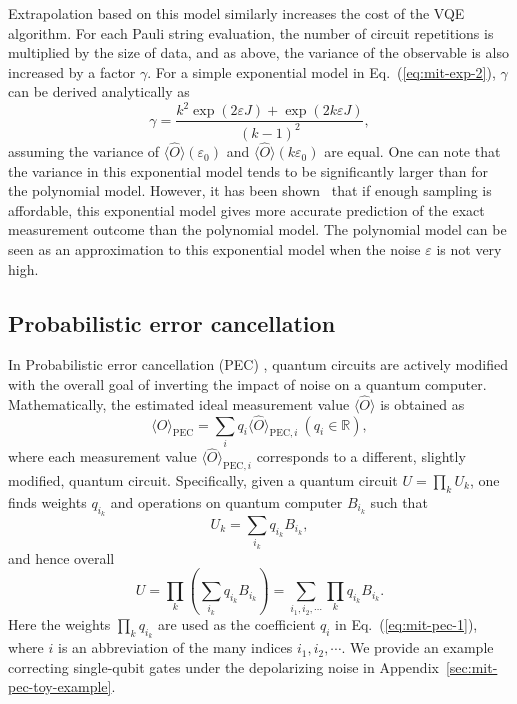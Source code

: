 Extrapolation based on this model similarly increases the cost of the VQE  algorithm.  For each Pauli string evaluation, the number of circuit repetitions is multiplied by the size of data, and as above, the variance of the observable is also increased by a factor $\gamma$.  For a simple exponential model in Eq.~(\ref{eq:mit-exp-2}), $\gamma$ can be derived analytically as \cite{suguru2019a}
\begin{equation}
    \gamma = \frac{k^{2} \exp(2\varepsilon J)+\exp(2 k \varepsilon J )}{(k-1)^{2}},
\end{equation}
assuming the variance of $\langle \hat{O} \rangle( \varepsilon _{0})$ and $\langle \hat{O} \rangle( k\varepsilon _{0})$ are equal.
One can note that the variance in this exponential model tends to be significantly larger than for the polynomial model. %
However, it has been shown~\cite{endoPracticalQuantumError2018} that if enough sampling is affordable, this exponential model gives more accurate prediction of the exact measurement outcome than the polynomial model.
The polynomial model can be seen as an approximation to this exponential model when the noise
$\varepsilon$ is not very high.

\subsection{Probabilistic error cancellation}
\label{sec:mit_pec}
In Probabilistic error cancellation (PEC) \cite{temmeErrorMitigationShortDepth2017,endoPracticalQuantumError2018},
quantum circuits are actively modified with the overall goal of inverting the impact of noise on a quantum computer. Mathematically, the estimated ideal measurement value $\langle \hat{O} \rangle$ is obtained as
\begin{equation}
    \label{eq:mit-pec-1}
    \langle \hat{O} \rangle_{\mathrm{PEC}} =\sum _{i} q_{i} \langle \hat{O} \rangle_{\mathrm{PEC},i} \ ( q_{i} \in \mathbb{R}),
\end{equation}
where each measurement value $\langle \hat{O} \rangle_{\mathrm{PEC},i}$ corresponds to a different, slightly modified, quantum circuit. Specifically,
given a quantum circuit $U=\prod_k U_k$,
one finds weights $q_{i_k}$ and operations on quantum computer $B_{i_k}$ such that
\begin{equation}
    U_k = \sum_{i_k} q_{i_k} B_{i_k},
\end{equation}
and hence overall
\begin{equation}\label{eq:mit-pec-cor-all-decomp}
U = \prod_k \left(\sum_{i_k} q_{i_k} B_{i_k}\right) 
= \sum_{i_1,i_2,\cdots} \prod_k q_{i_k} B_{i_k}.
\end{equation}
Here the weights $\prod_k q_{i_k}$ are used as the coefficient $q_i$ in Eq.~(\ref{eq:mit-pec-1}),
where $i$ is an abbreviation of the many indices $i_1,i_2,\cdots$.
We provide an example correcting single-qubit gates under the depolarizing noise in Appendix~\ref{sec:mit-pec-toy-example}.

